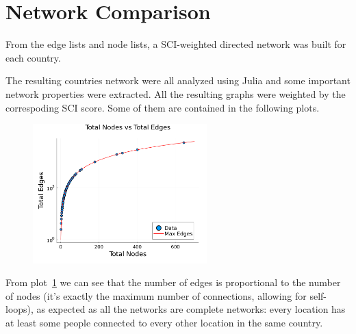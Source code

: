 \section{Network Comparison}
From the edge lists and node lists, a SCI-weighted directed network was built for each country.


The resulting countries network were all analyzed using Julia and some important network properties were extracted. All the resulting graphs were weighted by the correspoding SCI score.
Some of them are contained in the following plots.

\begin{figure}[H]
    \centering
    \includegraphics[width=0.6\textwidth]{images/task44/TotalNodesVsTotalEdges.png}
    \caption{}
    \label{fig:TotalNodesVsTotalEdges}
\end{figure}

From plot~\ref{fig:TotalNodesVsTotalEdges} we can see that the number of edges is proportional to the number of nodes (it's exactly the maximum number of connections, allowing for self-loops), as expected as all the networks are complete networks: every location has at least some people connected to every other location in the same country.


